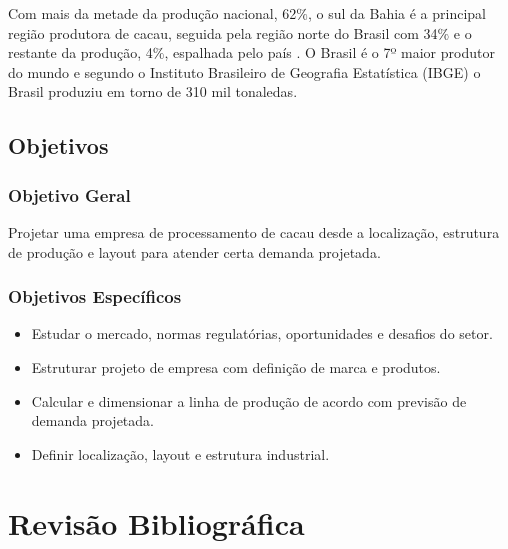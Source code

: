 \documentclass[
	12pt,				%
	openright,			%
	oneside,			%
	a4paper,			%
	english,			%
	french,				%
	spanish,			%
	brazil				%
	]{abntex2}
\begin{document}
Com mais da metade da produção nacional, 62$\%$, o sul da Bahia é a principal região produtora de cacau, seguida pela região norte do Brasil com 34$\%$ e o restante da produção, 4$\%$, espalhada pelo país \cite{1}. O Brasil é o 7º maior produtor do mundo e segundo o Instituto Brasileiro de Geografia Estatística (IBGE) o Brasil produziu em torno de 310 mil tonaledas. \cite{3} 


\section{Objetivos}

\subsection{Objetivo Geral}

Projetar uma empresa de processamento de cacau desde a localização, estrutura de produção e layout para atender certa demanda projetada.

\subsection{Objetivos Específicos}

\begin{itemize}
\item Estudar o mercado, normas regulatórias, oportunidades e desafios do setor.
\item Estruturar projeto de empresa com definição de marca e produtos.
\item Calcular e dimensionar a linha de produção de acordo com previsão de demanda projetada.
\item Definir localização, layout e estrutura industrial.
\end{itemize}

\newpage
\chapter{Revisão Bibliográfica}


\end{document}
